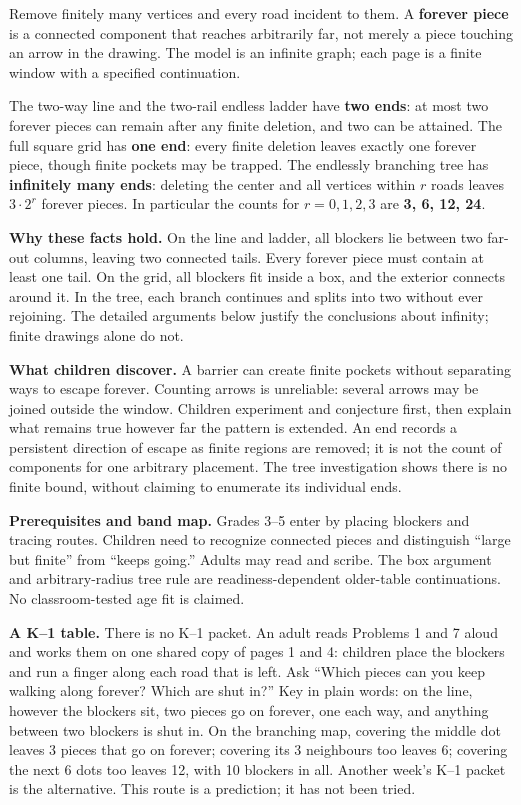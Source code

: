 \documentclass[11pt,letterpaper]{article}
\newcommand{\heading}[1]{\par\vspace{5pt}{\large\bfseries #1}\par}
\begin{document}
\heading{Mathematical destination}
Remove finitely many vertices and every road incident to them. A \textbf{forever piece} is a connected component that reaches arbitrarily far, not merely a piece touching an arrow in the drawing. The model is an infinite graph; each page is a finite window with a specified continuation.

The two-way line and the two-rail endless ladder have \textbf{two ends}: at most two forever pieces can remain after any finite deletion, and two can be attained. The full square grid has \textbf{one end}: every finite deletion leaves exactly one forever piece, though finite pockets may be trapped. The endlessly branching tree has \textbf{infinitely many ends}: deleting the center and all vertices within $r$ roads leaves $3\cdot2^r$ forever pieces. In particular the counts for $r=0,1,2,3$ are \textbf{3, 6, 12, 24}.

\textbf{Why these facts hold.} On the line and ladder, all blockers lie between two far-out columns, leaving two connected tails. Every forever piece must contain at least one tail. On the grid, all blockers fit inside a box, and the exterior connects around it. In the tree, each branch continues and splits into two without ever rejoining. The detailed arguments below justify the conclusions about infinity; finite drawings alone do not.

\textbf{What children discover.} A barrier can create finite pockets without separating ways to escape forever. Counting arrows is unreliable: several arrows may be joined outside the window. Children experiment and conjecture first, then explain what remains true however far the pattern is extended. An end records a persistent direction of escape as finite regions are removed; it is not the count of components for one arbitrary placement. The tree investigation shows there is no finite bound, without claiming to enumerate its individual ends.

\textbf{Prerequisites and band map.} Grades 3--5 enter by placing blockers and tracing routes. Children need to recognize connected pieces and distinguish ``large but finite'' from ``keeps going.'' Adults may read and scribe. The box argument and arbitrary-radius tree rule are readiness-dependent older-table continuations. No classroom-tested age fit is claimed.

\textbf{A K--1 table.} There is no K--1 packet. An adult reads Problems 1 and 7 aloud and works them on one shared copy of pages 1 and 4: children place the blockers and run a finger along each road that is left. Ask ``Which pieces can you keep walking along forever? Which are shut in?'' Key in plain words: on the line, however the blockers sit, two pieces go on forever, one each way, and anything between two blockers is shut in. On the branching map, covering the middle dot leaves 3 pieces that go on forever; covering its 3 neighbours too leaves 6; covering the next 6 dots too leaves 12, with 10 blockers in all. Another week's K--1 packet is the alternative. This route is a prediction; it has not been tried.
\end{document}
